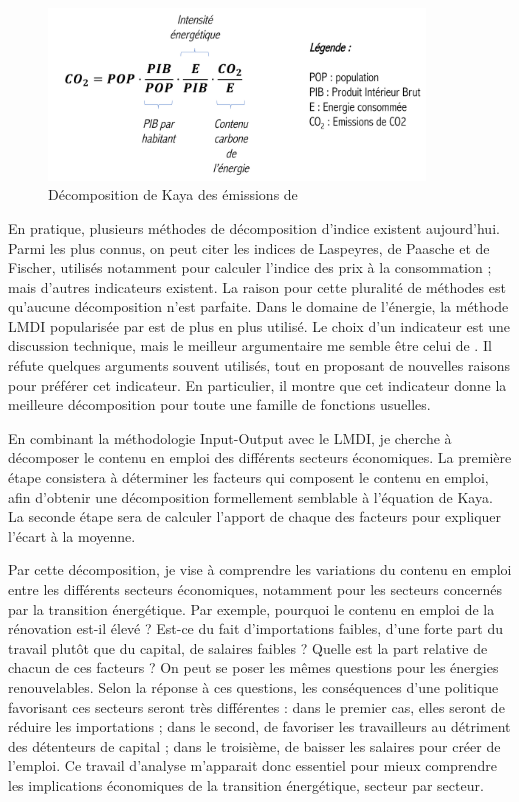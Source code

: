 \begin{figure}[!ht]
	\centering
	\includegraphics[width=10cm]{figures/Kaya.pdf}
	\caption[Décomposition de Kaya des émissions]{Décomposition de Kaya des émissions de \coo}
	\label{fig:kaya}
\end{figure}

En pratique, plusieurs méthodes de décomposition d'indice existent aujourd'hui. Parmi les plus connus, on peut citer les indices de Laspeyres, de Paasche et de Fischer, utilisés notamment pour calculer l'indice des prix à la consommation ; mais d'autres indicateurs existent. La raison pour cette pluralité de méthodes est qu'aucune décomposition n'est parfaite. Dans le domaine de l'énergie, la méthode LMDI popularisée par \citet{Ang2004} est de plus en plus utilisé. Le choix d'un indicateur est une discussion technique, mais le meilleur argumentaire me semble être celui de \citet{Muller}. Il réfute quelques arguments souvent utilisés, tout en proposant de nouvelles raisons pour préférer cet indicateur. En particulier, il montre que cet indicateur donne la meilleure décomposition pour toute une famille de fonctions usuelles.

En combinant la méthodologie Input-Output avec le LMDI, je cherche à décomposer le contenu en emploi des différents secteurs économiques. La première étape consistera à déterminer les facteurs qui composent le contenu en emploi, afin d'obtenir une décomposition formellement semblable à l'équation de Kaya.
La seconde étape sera de calculer l'apport de chaque des facteurs pour expliquer l'écart à la moyenne.

Par cette décomposition, je vise à comprendre les variations du contenu en emploi entre les différents secteurs économiques, notamment pour les secteurs concernés par la transition énergétique.
Par exemple, pourquoi le contenu en emploi de la rénovation est-il élevé ? Est-ce du fait d'importations faibles, d'une forte part du travail plutôt que du capital, de salaires faibles ? Quelle est la part relative de chacun de ces facteurs ? On peut se poser les mêmes questions pour les énergies renouvelables.
Selon la réponse à ces questions, les conséquences d'une politique favorisant ces secteurs seront très différentes : dans le premier cas, elles seront de réduire les importations ; dans le second, de favoriser les travailleurs au détriment des détenteurs de capital ; dans le troisième, de baisser les salaires pour créer de l'emploi. 
Ce travail d'analyse m'apparait donc essentiel pour mieux comprendre les implications économiques de la transition énergétique, secteur par secteur.



